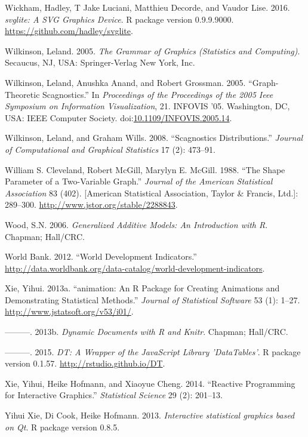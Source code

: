 \documentclass[12pt,]{isuthesis}
\begin{document}
\hypertarget{ref-svglite}{}
Wickham, Hadley, T Jake Luciani, Matthieu Decorde, and Vaudor Lise.
2016. \emph{svglite: A SVG Graphics Device}. R package version
0.9.9.9000. \url{https://github.com/hadley/svglite}.

\hypertarget{ref-Wilkinson:2005}{}
Wilkinson, Leland. 2005. \emph{The Grammar of Graphics (Statistics and
Computing)}. Secaucus, NJ, USA: Springer-Verlag New York, Inc.

\hypertarget{ref-Wilkinson:2005b}{}
Wilkinson, Leland, Anushka Anand, and Robert Grossman. 2005.
``Graph-Theoretic Scagnostics.'' In \emph{Proceedings of the Proceedings
of the 2005 Ieee Symposium on Information Visualization}, 21. INFOVIS
'05. Washington, DC, USA: IEEE Computer Society.
doi:\href{https://doi.org/10.1109/INFOVIS.2005.14}{10.1109/INFOVIS.2005.14}.

\hypertarget{ref-Wilkinson:2008}{}
Wilkinson, Leland, and Graham Wills. 2008. ``Scagnostics
Distributions.'' \emph{Journal of Computational and Graphical
Statistics} 17 (2): 473--91.

\hypertarget{ref-banking}{}
William S. Cleveland, Robert McGill, Marylyn E. McGill. 1988. ``The
Shape Parameter of a Two-Variable Graph.'' \emph{Journal of the American
Statistical Association} 83 (402). {[}American Statistical Association,
Taylor \& Francis, Ltd.{]}: 289--300.
\url{http://www.jstor.org/stable/2288843}.

\hypertarget{ref-mgcv}{}
Wood, S.N. 2006. \emph{Generalized Additive Models: An Introduction with
R}. Chapman; Hall/CRC.

\hypertarget{ref-WorldBank}{}
World Bank. 2012. ``World Development Indicators.''
\url{http://data.worldbank.org/data-catalog/world-development-indicators}.

\hypertarget{ref-animation}{}
Xie, Yihui. 2013a. ``animation: An R Package for Creating Animations and
Demonstrating Statistical Methods.'' \emph{Journal of Statistical
Software} 53 (1): 1--27. \url{http://www.jstatsoft.org/v53/i01/}.

\hypertarget{ref-knitr}{}
---------. 2013b. \emph{Dynamic Documents with R and Knitr}. Chapman;
Hall/CRC.

\hypertarget{ref-DT}{}
---------. 2015. \emph{DT: A Wrapper of the JavaScript Library
'DataTables'}. R package version 0.1.57.
\url{http://rstudio.github.io/DT}.

\hypertarget{ref-Xie:2014co}{}
Xie, Yihui, Heike Hofmann, and Xiaoyue Cheng. 2014. ``Reactive
Programming for Interactive Graphics.'' \emph{Statistical Science} 29
(2): 201--13.

\hypertarget{ref-cranvas}{}
Yihui Xie, Di Cook, Heike Hofmann. 2013. \emph{Interactive statistical
graphics based on Qt}. R package version 0.8.5.

%
\end{document}
